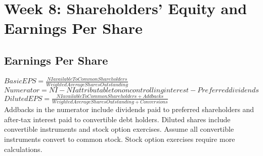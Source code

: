 \section*{Week 8: Shareholders' Equity and Earnings Per Share}

\subsection*{Earnings Per Share}

$Basic EPS = \frac{NIavailableToCommonShareholders}{Weighted Average Shares Outstanding}$ \\

$Numerator = NI - NI attributable to noncontrolling interest - Preferred dividends $ \\


$Diluted EPS = \frac{NIavailableToCommonShareholders+Addbacks}{Weighted Average Shares Outstanding+Conversions}$ \\

Addbacks in the numerator include dividends paid to preferred shareholders and after-tax
interest paid to convertible debt holders.
Diluted shares include convertible instruments and stock option exercises. Assume all
convertible instruments convert to common stock. Stock option exercises require more
calculations.
